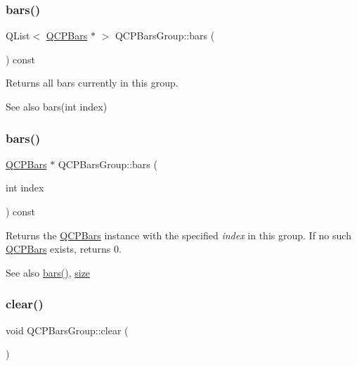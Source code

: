 \subsubsection{\texorpdfstring{bars()}{bars()}\hspace{0.1cm}{\footnotesize\ttfamily [1/2]}}
{\footnotesize\ttfamily Q\+List$<$ \mbox{\hyperlink{class_q_c_p_bars}{Q\+C\+P\+Bars}} $\ast$ $>$ Q\+C\+P\+Bars\+Group\+::bars (\begin{DoxyParamCaption}{ }\end{DoxyParamCaption}) const\hspace{0.3cm}{\ttfamily [inline]}}

Returns all bars currently in this group.

\begin{DoxySeeAlso}{See also}
bars(int index) 
\end{DoxySeeAlso}
\mbox{\label{class_q_c_p_bars_group_a0754d659a020aa7fddfe81e657ce2d92}} 
\subsubsection{\texorpdfstring{bars()}{bars()}\hspace{0.1cm}{\footnotesize\ttfamily [2/2]}}
{\footnotesize\ttfamily \mbox{\hyperlink{class_q_c_p_bars}{Q\+C\+P\+Bars}} $\ast$ Q\+C\+P\+Bars\+Group\+::bars (\begin{DoxyParamCaption}\item[{int}]{index }\end{DoxyParamCaption}) const}

Returns the \mbox{\hyperlink{class_q_c_p_bars}{Q\+C\+P\+Bars}} instance with the specified {\itshape index} in this group. If no such \mbox{\hyperlink{class_q_c_p_bars}{Q\+C\+P\+Bars}} exists, returns 0.

\begin{DoxySeeAlso}{See also}
\mbox{\hyperlink{class_q_c_p_bars_group_a6e4f4e86abbec6a9342f204ef82abef8}{bars()}}, \mbox{\hyperlink{class_q_c_p_bars_group_a3780ec77919cb00840207ec7a0f00dd5}{size}} 
\end{DoxySeeAlso}
\mbox{\label{class_q_c_p_bars_group_a3ddf23928c6cd89530bd34ab7ba7b177}} 
\subsubsection{\texorpdfstring{clear()}{clear()}}
{\footnotesize\ttfamily void Q\+C\+P\+Bars\+Group\+::clear (\begin{DoxyParamCaption}{ }\end{DoxyParamCaption})}

